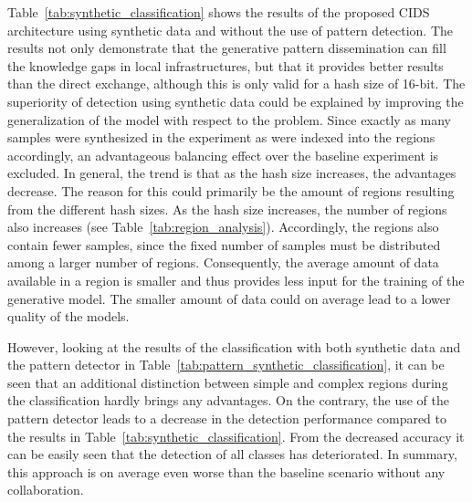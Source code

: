 \documentclass[../../main.tex]{subfiles}
\begin{document}
Table~\ref{tab:synthetic_classification} shows the results of the proposed CIDS architecture using synthetic data and without the use of pattern detection. The results not only demonstrate that the generative pattern dissemination can fill the knowledge gaps in local infrastructures, but that it provides better results than the direct exchange, although this is only valid for a hash size of 16-bit. The superiority of detection using synthetic data could be explained by improving the generalization of the model with respect to the problem. Since exactly as many samples were synthesized in the experiment as were indexed into the regions accordingly, an advantageous balancing effect over the baseline experiment is excluded. In general, the trend is that as the hash size increases, the advantages decrease. The reason for this could primarily be the amount of regions resulting from the different hash sizes. As the hash size increases, the number of regions also increases (see Table~\ref{tab:region_analysis}). Accordingly, the regions also contain fewer samples, since the fixed number of samples must be distributed among a larger number of regions. Consequently, the average amount of data available in a region is smaller and thus provides less input for the training of the generative model. The smaller amount of data could on average lead to a lower quality of the models. 

However, looking at the results of the classification with both synthetic data and the pattern detector in Table~\ref{tab:pattern_synthetic_classification}, it can be seen that an additional distinction between simple and complex regions during the classification hardly brings any advantages. On the contrary, the use of the pattern detector leads to a decrease in the detection performance compared to the results in Table~\ref{tab:synthetic_classification}. From the decreased accuracy it can be easily seen that the detection of all classes has deteriorated. In summary, this approach is on average even worse than the baseline scenario without any collaboration.
\end{document}
